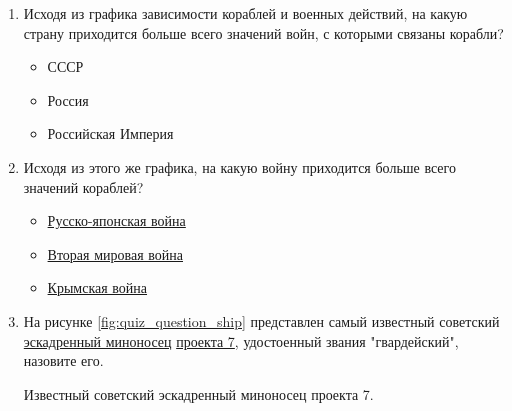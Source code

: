 \begin{enumerate}
  \item Исходя из графика зависимости кораблей и военных действий, на какую страну приходится больше всего значений войн, с которыми связаны корабли?
  \begin{itemize}
    \item СССР
    \item Россия
    \item Российская Империя
  \end{itemize}

  \item Исходя из этого же графика, на какую войну приходится больше всего значений кораблей?
  \begin{itemize}
    \item \href{https://www.wikidata.org/wiki/Q159950}{Русско-японская война}
    \item \href{https://www.wikidata.org/wiki/Q362}{Вторая мировая война}
    \item \href{https://www.wikidata.org/wiki/Q254106}{Крымская война}
  \end{itemize}

  \item На рисунке \ref{fig:quiz_question_ship} представлен самый известный советский \href{https://ru.wikipedia.org/wiki/Эскадренный_миноносец}{эскадренный миноносец} \href{https://ru.wikipedia.org/wiki/Эскадренные_миноносцы_проекта_7}{проекта 7}, удостоенный звания "гвардейский", назовите его.
  
  \begin{marginfigure}[0.0cm]
    {
      \setlength{\fboxsep}{0pt}%
      \setlength{\fboxrule}{1pt}%
    }
    \caption{ Известный советский эскадренный миноносец проекта 7.
     }%
      \label{fig:quiz_question_ship}%
    \end{marginfigure}
\end{enumerate}